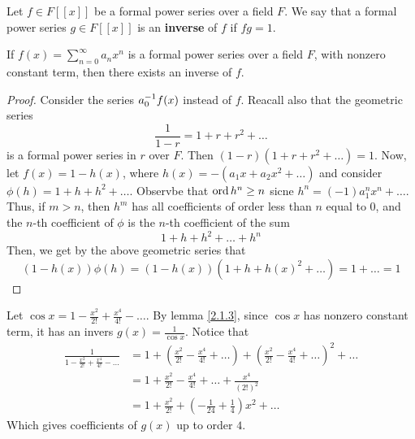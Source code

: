 \begin{definition}
    Let $f \in F[[x]]$ be a formal power series over a field  $F$. We say that a
    formal power series  $g \in F[[x]]$ is an \textbf{inverse} of $f$ if
    $fg=1$.
\end{definition}

\begin{lemma}\label{2.1.3}
    If $f(x)=\sum_{n=0}^\infty{a_nx^n}$ is a formal power series over a field
    $F$, with nonzero constant term, then there exists an inverse of $f$.
\end{lemma}
\begin{proof}
    Consider the series $a_0^{-1}f(x)$ instead of $f$. Reacall also that the
    geometric series
    \begin{equation*}
        \frac{1}{1-r}=1+r+r^2+\dots
    \end{equation*}
    is a formal power series in $r$ over $F$. Then $(1-r)(1+r+r^2+\dots)=1$.
    Now, let $f(x)=1-h(x)$, where $h(x)=-(a_1x+a_2x^2+\dots)$ and consider
    $\phi(h)=1+h+h^2+\dots$. Observbe that $\operatorname{ord}{h^n} \geq n$ sicne
    $h^n=(-1)a_1^nx^n+\dots$. Thus, if $m>n$, then  $h^m$ has all coefficients
    of order less than  $n$ equal to  $0$, and the $n$-th coefficient of $\phi$
    is the $n$-th coefficient of the sum
    \begin{equation*}
        1+h+h^2+\dots+h^n
    \end{equation*}
    Then, we get by the above geometric series that
    \begin{equation*}
        (1-h(x))\phi(h)=(1-h(x))(1+h+h(x)^2+\dots)=1+\dots=1
    \end{equation*}
\end{proof}

\begin{example}\label{example_2.1}
    Let $\cos{x}=1-\frac{x^2}{2!}+\frac{x^4}{4!}-\dots$. By lemma \ref{2.1.3},
    since $\cos{x}$ has nonzero constant term, it has an invers
    $g(x)=\frac{1}{\cos{x}}$. Notice that
    \begin{align*}
        \frac{1}{1-\frac{x^2}{2!}+\frac{x^4}{4!}-\dots} &= 1+(\frac{x^2}{2!}-
        \frac{x^4}{4!}+\dots)+(\frac{x^2}{2!}-\frac{x^4}{4!}+\dots)^2+\dots \\
            &= 1+\frac{x^2}{2!}-\frac{x^4}{4!}+\dots+\frac{x^4}{(2!)^2} \\
            &= 1+\frac{x^2}{2!}+(-\frac{1}{24}+\frac{1}{4})x^2+\dots
    \end{align*}
    Which gives coefficients of $g(x)$ up to order $4$.
\end{example}

